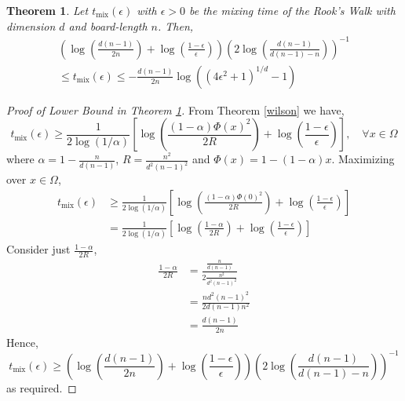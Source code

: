 \documentclass[10pt,a4paper]{amsart}
\newtheorem{theorem}{Theorem}
\begin{document}
      \begin{theorem}
         \label{main1}
      Let $t_\text{mix}(\epsilon)$ with $\epsilon >0$ be the mixing time of the Rook's Walk with dimension $d$ and board-length $n$. Then,
      \begin{multline*}
       \left(\log \left(\frac{d(n-1)}{2n}\right) + \log\left(\frac{1-\epsilon}{\epsilon}\right)\right)\left(2\log\left(\frac{d(n-1)}{d(n-1)-n}\right)\right)^{-1} \\
        \leq t_\text{mix}(\epsilon)  \leq-\frac{d(n-1)}{2n}\log\left((4\epsilon^2+1)^{1/d}-1\right) 
      \end{multline*}
   \end{theorem}

   \begin{proof}[Proof of Lower Bound in Theorem \ref{main1}]
      From Theorem \ref{wilson} we have,
   \[t_\text{mix}(\epsilon) \geq \frac{1}{2\log(1/\alpha)}\left[\log \left(\frac{(1-\alpha)\Phi(x)^2}{2R}\right) + \log\left(\frac{1-\epsilon}{\epsilon}\right)\right], \quad \forall x\in \Omega\]
   where $\alpha = 1-\frac{n}{d(n-1)}$, $R=\frac{n^2}{d^2(n-1)^2}$ and $\Phi(x) = 1-(1-\alpha)x$. Maximizing over $x\in \Omega$,
   \begin{align*}
   t_\text{mix}(\epsilon) &\geq \frac{1}{2\log(1/\alpha)}\left[\log \left(\frac{(1-\alpha)\Phi(0)^2}{2R}\right) + \log\left(\frac{1-\epsilon}{\epsilon}\right)\right]\\
   &= \frac{1}{2\log(1/\alpha)}\left[\log \left(\frac{1-\alpha}{2R}\right) + \log\left(\frac{1-\epsilon}{\epsilon}\right)\right]
   \end{align*}
   Consider just $\frac{1-\alpha}{2R}$,
   \begin{align*}
      \frac{1-\alpha}{2R}&= \frac{\frac{n}{d(n-1)}}{2\frac{n^2}{d^2(n-1)^2}}\\
      &= \frac{nd^2(n-1)^2}{2d(n-1)n^2}\\
      &= \frac{d(n-1)}{2n}
   \end{align*}
   Hence,
   \[t_\text{mix}(\epsilon) \geq \left(\log \left(\frac{d(n-1)}{2n}\right) + \log\left(\frac{1-\epsilon}{\epsilon}\right)\right)\left(2\log\left(\frac{d(n-1)}{d(n-1)-n}\right)\right)^{-1}\]
   as required.
   \end{proof}
\end{document}
